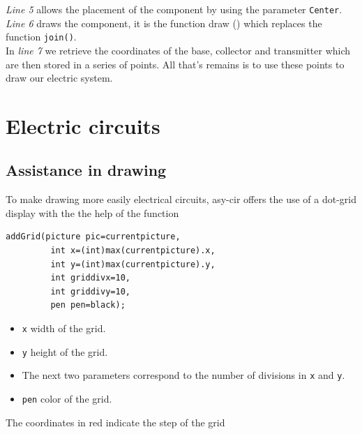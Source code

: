 \documentclass[10pt]{article}
\begin{document}

\emph{Line 5} allows the placement of the component by using the parameter \verb|Center|. \emph{Line 6} draws the component, it is the function draw () which replaces the function \verb|join()|.\\
In \emph{line 7} we retrieve the coordinates of the base, collector and transmitter which are then stored in a series of points. All that's remains is to use these points to draw our electric system.

\vspace{.5cm}
\section{Electric circuits}
\subsection{Assistance in drawing}
To make drawing more easily electrical circuits, asy-cir offers the use of a dot-grid display with the the help of the function
\begin{center}
\begin{minipage}{0.8\linewidth}
\begin{lstlisting}
addGrid(picture pic=currentpicture,
	     int x=(int)max(currentpicture).x,
	     int y=(int)max(currentpicture).y,
	     int griddivx=10,
	     int griddivy=10,
	     pen pen=black);
\end{lstlisting}
\end{minipage}
\end{center}

\begin{itemize}
\item \verb|x| width of the grid. 
\item \verb|y| height of the grid. 
\item The next two parameters correspond to the number of divisions in \verb|x| and \verb|y|.
\item \verb|pen| color of the grid.
\end{itemize}



The coordinates in red indicate the step of the grid
\noindent 
\newpage
\end{document}
